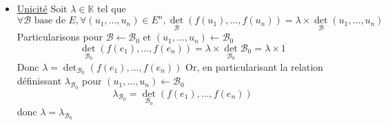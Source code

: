 \documentclass{article}
\begin{document}
\begin{question_kholle}
\begin{itemize}[label=$\lozenge$]
\begin{itemize}
\item Alternée
Soient $(u_{1}, \dots, u_{n}) \in E^{n}$ tels qu'il existe $(i, j) \in [ \! [ 1, n ] \!]^{2}$ tels que $i \neq j$ et $u_{i} = u_{j}$ alors on a aussi $f(u_{i}) = f(u_{j})$, si bien que le caractère alterné de $\det_{\mathcal{B}_{0}}$
$$
\varphi(u_{1}, \dots, u_{n})=\det_{\mathcal{B}_{0}}(f(u_{1}), \dots, f(u_{n})) = 0
$$
Donc $\varphi \in \land_{\mathbb{K}}^{n} = \text{Vect}\{ \det_{\mathcal{B}_{0}} \}$
\end{itemize}
Donc
$$
\exists \lambda_{\mathcal{B}_{0}}\in \mathbb{K}: \varphi = \lambda_{\mathcal{B}_{0}}.\det_{\mathcal{B_{0}}}
$$
d'où,
$$
\forall (u_{1}, \dots, u_{n}) \in E^{n}, \det_{\mathcal{B}_{0}}(f(u_{1}), \dots, f(u_{n}))= \lambda_{\mathcal{B}_{0}}\times \det_{\mathcal{B_{0}}}(u_{1}, \dots, u_{n})
$$
Soit $\mathcal{B}$ une base de $E$ fixée quelconque. Nous savons que
$$
\det_{\mathcal{B}} = \det_{\mathcal{B}} \mathcal{B}_{0} . \det_{\mathcal{B}_{0}}
$$
Donc en multipliant la relation précédente par $\det_{\mathcal{B}}\mathcal{B}_{0}$,
$$
\forall (u_{1}, \dots, u_{n}) \in E^{n}, \underbrace{ \det_{\mathcal{B}}\mathcal{B}_{0} \times \det_{\mathcal{B}_{0}}(f(u_{1}), \dots, f(u_{n})) }_{ \det_{\mathcal{B}}(f(u_{1}), \dots, f(u_{n})) }= \lambda_{\mathcal{B}_{0}} \times \underbrace{ \det_{\mathcal{B}}\mathcal{B}_{0} \times \det_{\mathcal{B_{0}}}(u_{1}, \dots, u_{n}) }_{ \det_{\mathcal{B}}(u_{1}, \dots, u_{n}) }
$$
Par conséquent, $\lambda_{\mathcal{B}_{0}}$ convient pour toute base $\mathcal{B}$.

\item \underline{Unicité}
Soit $\lambda \in \mathbb{K}$ tel que
$$
\forall \mathcal{B} \text{ base de }E, \forall (u_{1}, \dots, u_{n})\in E^{n}, \det_{\mathcal{B}}(f(u_{1}), \dots, f(u_{n}))=\lambda \times \det_{\mathcal{B}}(u_{1}, \dots, u_{n})
$$
Particularisons pour $\mathcal{B}\leftarrow \mathcal{B}_{0}$ et $(u_{1}, \dots, u_{n})\leftarrow \mathcal{B}_{0}$
$$
\det_{\mathcal{B}_{0}}(f(e_{1}), \dots, f(e_{n})) = \lambda \times \det_{\mathcal{B}_{0}}\mathcal{B}_{0} = \lambda \times 1
$$
Donc $\lambda = \det_{\mathcal{B}_{0}}(f(e_{1}), \dots, f(e_{n}))$
Or, en particularisant la relation définissant $\lambda_{\mathcal{B}_{0}}$ pour $(u_{1}, \dots, u_{n}) \leftarrow \mathcal{B}_{0}$
$$
\lambda_{\mathcal{B}_{0}} = \det_{\mathcal{B}_{0}}(f(e_{1}), \dots, f(e_{n}))
$$
donc $\lambda = \lambda_{\mathcal{B}_{0}}$
\end{itemize}
\end{question_kholle}
\end{document}
